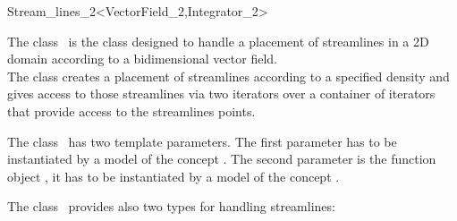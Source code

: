 

\ccModifierCrossRefOff
\begin{ccRefClass}{Stream_lines_2<VectorField_2,Integrator_2>}  %


\ccDefinition
  
The class \ccRefName\ is the class designed to handle a placement of
streamlines in a 2D domain according to a bidimensional vector
field.\\
The class \ccRefName  creates a placement of streamlines according to a 
specified density and gives access to those streamlines via two
iterators over a container of iterators that provide access to the
streamlines points.

\ccParameters
The class \ccRefName\ has two template parameters. The first parameter
 has to be instantiated by a model of the concept
. The second parameter is the function object
, it has to be instantiated by a model of the concept
.

\ccTypes
{}
\ccGlue
{}
\ccGlue
{}
\ccGlue
{}

The class \ccRefName\ provides also two types for handling
streamlines:

\ccGlue
{}
\ccGlue




\end{ccRefClass}
